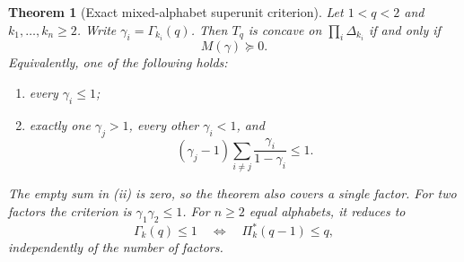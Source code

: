 \documentclass[11pt]{article}
\numberwithin{equation}{section}
\newtheorem{theorem}{Theorem}[section]
\theoremstyle{definition}
\theoremstyle{remark}
\begin{document}
\begin{theorem}[Exact mixed-alphabet superunit criterion]\label{bep:ae:thm:superunit}
Let $1<q<2$ and $k_1,\ldots,k_n\geq2$. Write
$\gamma_i=\Gamma_{k_i}(q)$. Then $T_q$ is concave on
$\prod_i\Delta_{k_i}$ if and only if
\begin{equation}\label{bep:ae:eq:supercriterion}
 M(\gamma)\succeq0.
\end{equation}
Equivalently, one of the following holds:
\begin{enumerate}[label=(\roman*),leftmargin=2.6em]
\item every $\gamma_i\leq1$;
\item exactly one $\gamma_j>1$, every other $\gamma_i<1$, and
\begin{equation}\label{bep:ae:eq:asymmetriccriterion}
 (\gamma_j-1)\sum_{i\ne j}\frac{\gamma_i}{1-\gamma_i}\leq1.
\end{equation}
\end{enumerate}
The empty sum in (ii) is zero, so the theorem also covers a single factor.
For two factors the criterion is $\gamma_1\gamma_2\leq1$.
For $n\geq2$ equal alphabets, it reduces to
\begin{equation}\label{bep:ae:eq:equalabove}
 \Gamma_k(q)\leq1
 \quad\Longleftrightarrow\quad \Pi^{*}_k(q-1)\leq q,
\end{equation}
independently of the number of factors.
\end{theorem}
\end{document}
